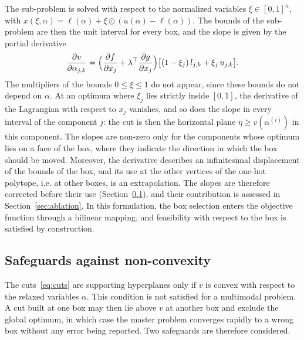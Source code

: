 \documentclass[pdflatex,sn-basic]{sn-jnl}
\begin{document}
The sub-problem is solved with respect to the normalized variables
$\xi \in [0,1]^n$, with
$x(\xi,\alpha) = \ell(\alpha) + \xi \odot (u(\alpha) - \ell(\alpha))$. The bounds
of the sub-problem are then the unit interval for every box, and the slope is
given by the partial derivative
\begin{equation}\label{eq:slope-normalized}
  \frac{\partial v}{\partial \alpha_{j,k}}
  = \Bigl(\frac{\partial f}{\partial x_j}
    + \lambda^\top \frac{\partial g}{\partial x_j}\Bigr)
    \bigl[(1-\xi_j)\,l_{j,k} + \xi_j\,u_{j,k}\bigr].
\end{equation}
The multipliers of the bounds $0 \le \xi \le 1$ do not appear, since these
bounds do not depend on $\alpha$. At an optimum where $\xi_j$ lies strictly
inside $[0, 1]$, the derivative of the Lagrangian with respect to $x_j$ vanishes,
and so does the slope in every interval of the component $j$: the cut is then
the horizontal plane $\eta \ge v(\alpha^{(i)})$ in this component. The slopes
are non-zero only for the components whose optimum lies on a face of the box,
where they indicate the direction in which the box should be moved. Moreover,
the derivative describes an infinitesimal displacement of the bounds of the
box, and its use at the other vertices of the one-hot polytope, i.e. at other
boxes, is an extrapolation. The slopes are therefore corrected before their use
(Section~\ref{sec:convexification}), and their contribution is assessed in
Section~\ref{sec:ablation}.
In this formulation, the box selection enters the objective function through a
bilinear mapping, and feasibility with respect to the box is satisfied by
construction.

\subsection{Safeguards against non-convexity}\label{sec:convexification}

The cuts~\eqref{eq:cuts} are supporting hyperplanes only if $v$ is convex with
respect to the relaxed variables $\alpha$. This condition is not satisfied for a
multimodal problem. A cut built at one box may then lie above $v$ at another box
and exclude the global optimum, in which case the master problem converges
rapidly to a wrong box without any error being reported. Two safeguards are
therefore considered.
\end{document}
